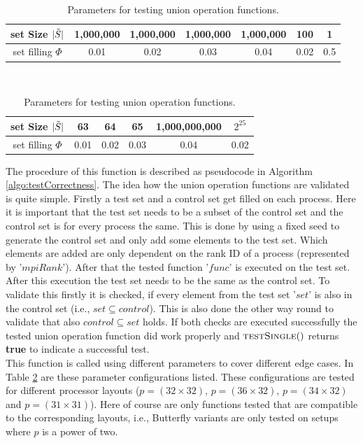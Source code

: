 \begin{table}[h]
	\centering
	\begin{tabular}{|c ||c|c|c|c|c|c|} \hline
		set Size $|\Tilde{S}|$ & 1,000,000 & 1,000,000 & 1,000,000 & 1,000,000 & 100 & 1 \\ \hline
		set filling $\Phi$ & 0.01 & 0.02 & 0.03 & 0.04 & 0.02 & 0.5  \\\hline
	\end{tabular}\\
	\vspace{5mm}
	\begin{tabular}{|c ||c|c|c|c|c|} \hline
		set Size $|\Tilde{S}|$ & 63 & 64 & 65 & 1,000,000,000 & $2^{25}$ \\ \hline
		set filling $\Phi$ & 0.01 & 0.02 & 0.03 & 0.04 & 0.02 \\ \hline
	\end{tabular}
	\caption{Parameters for testing union operation functions.}
	\label{table:paramTesting}
\end{table}
The procedure of this function is described as pseudocode in Algorithm \ref{algo:testCorrectness}. The idea how the union operation functions are validated is quite simple. Firstly a test set and a control set get filled  on each process. Here it is important that the test set needs to be a subset of the control set and the control set is for every process the same. This is done by using a fixed seed to generate the control set and only add some elements to the test set. Which elements are added are only dependent on the rank ID of a process (represented by '$mpiRank$'). After that the tested function '$func$' is executed on the test set. After this execution the test set needs to be the same as the control set. To validate this firstly it is checked, if every element from the test set '$set$' is also in the control set (i.e., $set\subseteq control$). This is also done the other way round to validate that also $control \subseteq set$ holds. If both checks are executed successfully the tested union operation function did work properly and $\Call{testSingle}{ }$ returns \textbf{true} to indicate a successful test.\\
This function is called using different parameters to cover different edge cases. In Table \ref{table:paramTesting} are these parameter configurations listed. These configurations are tested for different processor layouts ($p=(32\times32)$, $p=(36\times32)$, $p=(34\times32)$ and $p=(31\times31)$). Here of course are only functions tested that are compatible to the corresponding layouts, i.e., Butterfly variants are only tested on setups where $p$ is a power of two.

